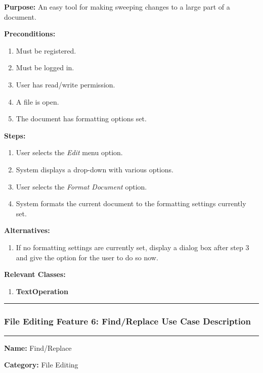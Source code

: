 \documentclass[twoside,letterpaper]{article}
\begin{document}
	\noindent\textbf{Purpose:} An easy tool for making sweeping changes to a large part of a document. \newline
	
	\noindent\textbf{Preconditions:}
	\begin{enumerate}
		\item Must be registered.
		\item Must be logged in.
		\item User has read/write permission.
		\item A file is open.
		\item The document has formatting options set.
	\end{enumerate}
	\noindent\textbf{Steps:}
	\begin{enumerate}
		\item User selects the \textit{Edit} menu option.
		\item System displays a drop-down with various options.
		\item User selects the \textit{Format Document} option.
		\item System formats the current document to the formatting settings currently set.
	\end{enumerate}
	\noindent\textbf{Alternatives:}
	\begin{enumerate}
		\item If no formatting settings are currently set, display a dialog box after step 3 and give the option for the user to do so now.
	\end{enumerate}
	\noindent\textbf{Relevant Classes:}
	\begin{enumerate}
		\item \textbf{TextOperation}
	\end{enumerate}
\vspace{8pt}
\hrule
\newpage

\subsubsection[File Editing Feature 6: Find/Replace]{\rmfamily\bfseries\color{black}
	File Editing Feature 6: Find/Replace Use Case Description}
\hypertarget{RefHeading22059017292}{}

\vspace{2pt}
\hrule
\vspace{8pt}
	\noindent\textbf{Name:} Find/Replace \newline
	
	\noindent\textbf{Category:} File Editing \newline
	
\end{document}
